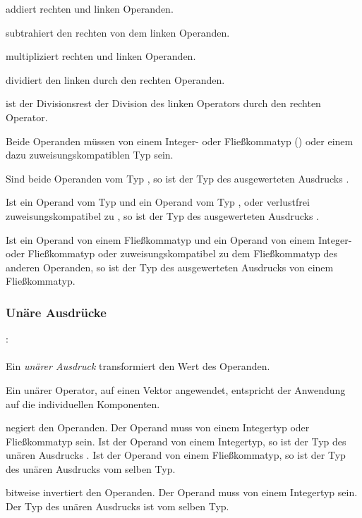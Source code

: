 \op{\plus} addiert rechten und linken Operanden.

\op{-} subtrahiert den rechten von dem linken Operanden.

\op{*} multipliziert rechten und linken Operanden.

\op{/} dividiert den linken durch den rechten Operanden.

\op{\%} ist der Divisionsrest der Division des linken Operators durch den rechten Operator.

Beide Operanden müssen von einem Integer- oder Fließkommatyp () oder einem
dazu zuweisungskompatiblen Typ sein.

Sind beide Operanden vom Typ , so ist der Typ des ausgewerteten Ausdrucks .

Ist ein Operand vom Typ  und ein Operand vom Typ ,  oder
verlustfrei zuweisungskompatibel zu , so ist der Typ des ausgewerteten Ausdrucks .

Ist ein Operand von einem Fließkommatyp und ein Operand von einem Integer- oder Fließkommatyp
oder zuweisungskompatibel zu dem Fließkommatyp des anderen Operanden,
so ist der Typ des ausgewerteten Ausdrucks von einem Fließkommatyp.


\subsubsection{Unäre Ausdrücke}\label{Unaere Ausdruecke}
:\label{asdr_unaer}\\
\hspace*{1cm}\Gopt{\Galt{\Gt{$\sim$}\Gor{}\Gt{-}\Gor{}\Gt{!}}}\Gspace{} \\

Ein \emph{unärer Ausdruck} transformiert den Wert des Operanden.

Ein unärer Operator, auf einen Vektor angewendet, entspricht der Anwendung auf die individuellen Komponenten.

\op{-} negiert den Operanden. Der Operand muss von einem Integertyp oder Fließkommatyp sein.
Ist der Operand von einem Integertyp, so ist der Typ des unären Ausdrucks .
Ist der Operand von einem Fließkommatyp, so ist der Typ des unären Ausdrucks vom selben Typ.

\op{$\sim$} bitweise invertiert den Operanden. Der Operand muss von einem Integertyp sein. Der Typ des unären Ausdrucks ist vom selben Typ.

